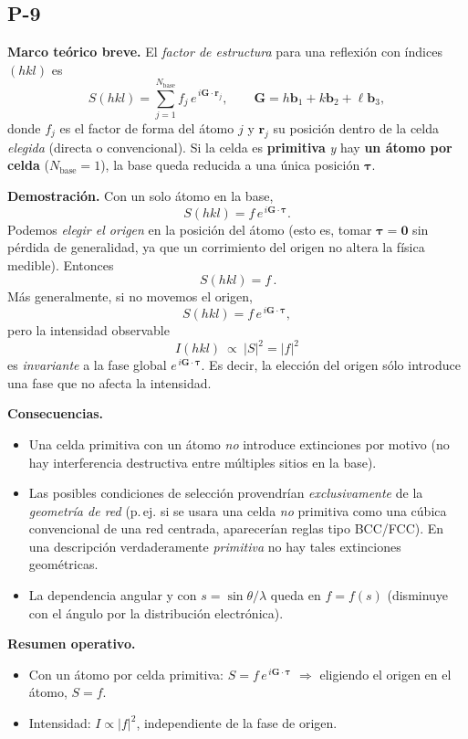 \documentclass{article}
\begin{document}
\subsection{P-9}

\textbf{Marco teórico breve.}  
El \emph{factor de estructura} para una reflexión con índices \((hkl)\) es
\[
S(hkl)=\sum_{j=1}^{N_{\text{base}}} f_j\,e^{\,i\mathbf{G}\cdot\mathbf{r}_j},
\qquad
\mathbf{G}=h\mathbf{b}_1+k\mathbf{b}_2+\ell\mathbf{b}_3,
\]
donde \(f_j\) es el factor de forma del átomo \(j\) y \(\mathbf{r}_j\) su posición dentro de la celda \emph{elegida} (directa o convencional).  
Si la celda es \textbf{primitiva} \emph{y} hay \textbf{un átomo por celda} (\(N_{\text{base}}=1\)), la base queda reducida a una única posición \(\boldsymbol{\tau}\).

\medskip
\textbf{Demostración.}  
Con un solo átomo en la base,
\[
S(hkl)= f\,e^{\,i\mathbf{G}\cdot\boldsymbol{\tau}}.
\]
Podemos \emph{elegir el origen} en la posición del átomo (esto es, tomar \(\boldsymbol{\tau}=\mathbf{0}\) sin pérdida de generalidad, ya que un corrimiento del origen no altera la física medible).  
Entonces
\[
\boxed{\,S(hkl)=f\,}.
\]
Más generalmente, si no movemos el origen,
\[
S(hkl)= f\,e^{\,i\mathbf{G}\cdot\boldsymbol{\tau}},
\]
pero la intensidad observable
\[
I(hkl)\ \propto\ |S|^2=|f|^2
\]
es \emph{invariante} a la fase global \(e^{\,i\mathbf{G}\cdot\boldsymbol{\tau}}\). Es decir, la elección del origen sólo introduce una fase que no afecta la intensidad.

\medskip
\textbf{Consecuencias.}
\begin{itemize}
\item Una celda primitiva con un átomo \emph{no} introduce extinciones por motivo (no hay interferencia destructiva entre múltiples sitios en la base).
\item Las posibles condiciones de selección provendrían \emph{exclusivamente} de la \emph{geometría de red} (p.\,ej. si se usara una celda \emph{no} primitiva como una cúbica convencional de una red centrada, aparecerían reglas tipo BCC/FCC). En una descripción verdaderamente \emph{primitiva} no hay tales extinciones geométricas.
\item La dependencia angular y con \(s=\sin\theta/\lambda\) queda en \(f=f(s)\) (disminuye con el ángulo por la distribución electrónica).
\end{itemize}

\medskip
\textbf{Resumen operativo.}
\begin{itemize}
\item Con un átomo por celda primitiva: \(S=f\,e^{\,i\mathbf{G}\cdot\boldsymbol{\tau}}\) \(\Rightarrow\) eligiendo el origen en el átomo, \(S=f\).
\item Intensidad: \(I\propto |f|^2\), independiente de la fase de origen.
\end{itemize}
 
\end{document}
